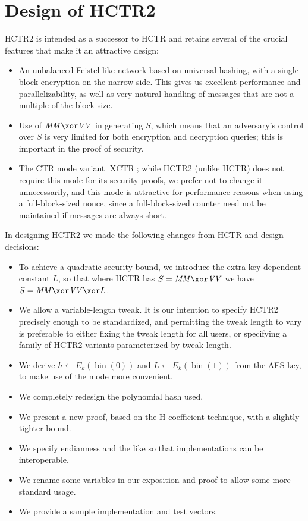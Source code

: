 \documentclass[letterpaper,11pt]{article}
\newcommand*{\MM}{\mathit{MM}}
\newcommand*{\VV}{\mathit{VV}}
\DeclareMathOperator{\fromint}{bin}
\DeclareMathOperator{\XCTR}{XCTR}
\begin{document}
\section{Design of HCTR2}
HCTR2 is intended as a successor to HCTR and retains several of the
crucial features that make it an attractive design:
\begin{itemize}
    \item An unbalanced Feistel-like network based on universal
    hashing, with a single block encryption on the narrow side.
    This gives us excellent performance and parallelizability,
    as well as very natural handling of messages that are not
    a multiple of the block size.
    \item Use of \(\MM \xor \VV\) in generating \(S\), which means
    that an adversary's control over \(S\) is very limited for both
    encryption and decryption queries; this is important in the
    proof of security.
    \item The CTR mode variant \(\XCTR\); while HCTR2 (unlike HCTR)
    does not require this mode for its security proofs, 
    we prefer not to change it unnecessarily, and this mode is
    attractive for performance reasons when using a full-block-sized
    nonce, since a full-block-sized counter need not be maintained
    if messages are always short.
\end{itemize}

In designing HCTR2 we made the following changes from HCTR and design decisions:

\begin{itemize}
    \item To achieve a quadratic security bound, we introduce the extra
    key-dependent constant \(L\),
    so that where HCTR has \(S = \MM \xor \VV\)
    we have \(S = \MM \xor \VV \xor L\).
    \item We allow a variable-length tweak. It is our intention to specify
    HCTR2 precisely enough to be standardized, and permitting the tweak length
    to vary is preferable to either fixing the tweak length for all users,
    or specifying a family of HCTR2 variants parameterized by tweak length.
    \item We derive \(h \gets E_k(\fromint(0))\)
    and \(L \gets E_k(\fromint(1))\) from the AES key, to make use of the
    mode more convenient.
    \item We completely redesign the polynomial hash used.
    \item We present a new proof, based on the H-coefficient technique, with a slightly tighter bound.
    \item We specify endianness and the like so that implementations can be interoperable.
    \item We rename some variables in our exposition and proof to allow some more standard usage.
    \item We provide a sample implementation and test vectors.
\end{itemize}
\end{document}
